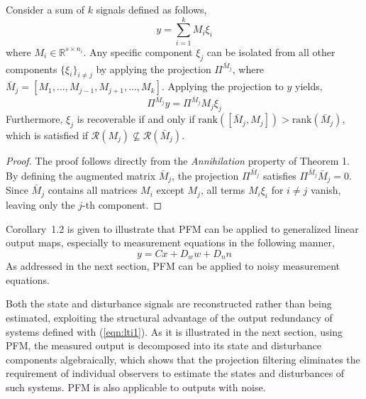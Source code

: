 \begin{corollary}[Generalization]
Consider a sum of $k$ signals defined as follows,
\begin{equation*}
    y = \sum_{i=1}^k M_i \xi_i
\end{equation*}
where $M_i \in \mathbb{R}^{s \times n_i}$. Any specific component $\xi_j$ can be isolated from all other components $\{ \xi_i \}_{i \neq j}$ by applying the projection $\Pi^{\bar{M}_j}$, where $\bar{M}_j = [M_1, \dots, M_{j-1}, M_{j+1}, \dots, M_k]$. Applying the projection to $y$ yields,
\begin{equation*}
    \Pi^{\bar{M}_j} y = \Pi^{\bar{M}_j} M_j \xi_j
\end{equation*}
Furthermore, $\xi_j$ is recoverable if and only if $\mathrm{rank}([\bar{M}_j, M_j]) > \mathrm{rank}(\bar{M}_j)$, which is satisfied if $\mathcal{R}(M_j) \not\subseteq \mathcal{R}(\bar{M}_j)$.
\end{corollary}

\begin{proof}
The proof follows directly from the \textit{Annihilation} property of Theorem 1. By defining the augmented matrix $\bar{M}_j$, the projection $\Pi^{\bar{M}_j}$ satisfies $\Pi^{\bar{M}_j} \bar{M}_j = 0$. Since $\bar{M}_j$ contains all matrices $M_i$ except $M_j$, all terms $M_i \xi_i$ for $i \neq j$ vanish, leaving only the $j$-th component.
\end{proof}

Corollary~1.2 is given to illustrate that PFM can be applied to generalized linear output maps, especially to measurement equations in the following manner,
\begin{equation} 
    y=Cx+D_w w+D_n n
\end{equation} 
As addressed in the next section, PFM can be applied to noisy measurement equations. 

Both the state and disturbance signals are reconstructed rather than being estimated, exploiting the structural advantage of the output redundancy of systems defined with (\ref{eqn:lti1}). As it is illustrated in the next section, using PFM, the measured output is decomposed into its state and disturbance components algebraically, which shows that the projection filtering eliminates the requirement of individual observers to estimate the states and disturbances of such systems. PFM is also applicable to outputs with noise.
